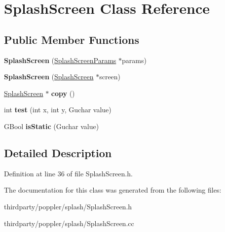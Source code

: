 \hypertarget{class_splash_screen}{}\section{Splash\+Screen Class Reference}
\label{class_splash_screen}
\subsection*{Public Member Functions}
\begin{DoxyCompactItemize}
\item 
\mbox{\label{class_splash_screen_a197355cda0aec77a7747165540a8e809}} 
{\bfseries Splash\+Screen} (\hyperlink{struct_splash_screen_params}{Splash\+Screen\+Params} $\ast$params)
\item 
\mbox{\label{class_splash_screen_a761e664910929bfbc689203f0c5ea701}} 
{\bfseries Splash\+Screen} (\hyperlink{class_splash_screen}{Splash\+Screen} $\ast$screen)
\item 
\mbox{\label{class_splash_screen_aa64f36d0910879023acd9001af1c1f38}} 
\hyperlink{class_splash_screen}{Splash\+Screen} $\ast$ {\bfseries copy} ()
\item 
\mbox{\label{class_splash_screen_a6bac74397eeec7de7cbe41d52b722656}} 
int {\bfseries test} (int x, int y, Guchar value)
\item 
\mbox{\label{class_splash_screen_a4036982613d47386de853af8651a66d8}} 
G\+Bool {\bfseries is\+Static} (Guchar value)
\end{DoxyCompactItemize}


\subsection{Detailed Description}


Definition at line 36 of file Splash\+Screen.\+h.



The documentation for this class was generated from the following files\+:\begin{DoxyCompactItemize}
\item 
thirdparty/poppler/splash/Splash\+Screen.\+h\item 
thirdparty/poppler/splash/Splash\+Screen.\+cc\end{DoxyCompactItemize}
